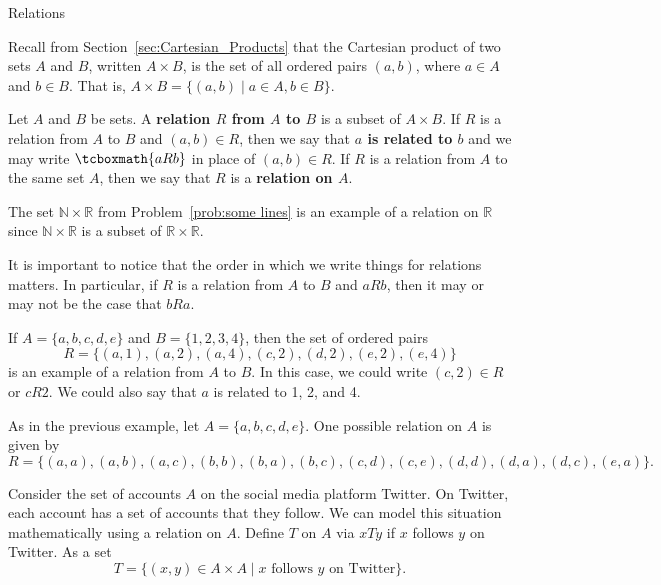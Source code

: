 \begin{section}{Relations}\label{sec:Relations}

Recall from Section~\ref{sec:Cartesian_Products} that the Cartesian product of two sets $A$ and $B$, written $A\times B$, is the set of all ordered pairs $(a,b)$, where $a\in A$ and $b\in B$. That is, $A\times B=\{(a,b)\mid a\in A, b\in B\}$.

\begin{definition}
Let $A$ and $B$ be sets. A \textbf{relation $R$ from $A$ to $B$} is a subset of $A \times B$. If $R$ is a relation from $A$ to $B$ and $(a,b)\in {R}$, then we say that \textbf{$a$ is related to $b$} and we may write $\tcboxmath{aR b}$ in place of $(a,b)\in{R}$. If $R$ is a relation from $A$ to the same set $A$, then we say that $R$ is a \textbf{relation on $A$}.
\end{definition}

\begin{example}
The set $\mathbb{N}\times \mathbb{R}$ from Problem~\ref{prob:some lines} is an example of a relation on $\mathbb{R}$ since $\mathbb{N}\times \mathbb{R}$ is a subset of $\mathbb{R}\times \mathbb{R}$.
\end{example}

It is important to notice that the order in which we write things for relations matters.  In particular, if $R$ is a relation from $A$ to $B$ and $a R b$, then it may or may not be the case that $bR a$.

\begin{example}\label{ex:relation finite to finite}
If $A=\{a,b,c,d,e\}$ and $B=\{1,2,3,4\}$, then the set of ordered pairs
\[
R=\{(a,1),(a,2),(a,4),(c,2),(d,2),(e,2),(e,4)\}
\]
is an example of a relation from $A$ to $B$. In this case, we could write $(c,2)\in{R}$ or $cR 2$. We could also say that $a$ is related to 1, 2, and 4. 
\end{example}

\begin{example}\label{ex:relation on finite}
As in the previous example, let $A=\{a,b,c,d,e\}$. One possible relation on $A$ is given by
\[
R=\{(a,a),(a,b),(a,c),(b,b),(b,a),(b,c),(c,d),(c,e),(d,d),(d,a),(d,c),(e,a)\}.
\]
\end{example}

\begin{example}\label{ex:Twitter}
Consider the set of accounts $A$ on the social media platform Twitter.  On Twitter, each account has a set of accounts that they follow.  We can model this situation mathematically using a relation on $A$.  Define $T$ on $A$ via $xTy$ if  $x$ follows $y$ on Twitter. As a set
\[
T=\{(x,y)\in A\times A\mid x\text{ follows }y\text{ on Twitter}\}.
\]
\end{example}


\end{section}
